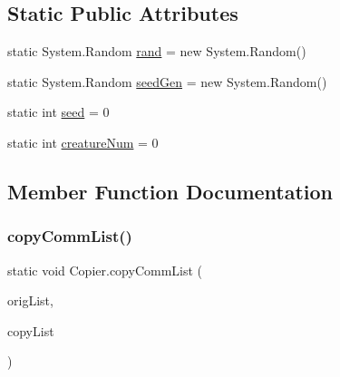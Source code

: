 \subsection*{Static Public Attributes}
\begin{DoxyCompactItemize}
\item 
static System.\+Random \mbox{\hyperlink{class_copier_ac2bbed854907158508f714b65783418e}{rand}} = new System.\+Random()
\item 
static System.\+Random \mbox{\hyperlink{class_copier_a74089df571f0e9ffadd5879bf0199dac}{seed\+Gen}} = new System.\+Random()
\item 
static int \mbox{\hyperlink{class_copier_a5f70131c00bf001cc92dd4cee4a80540}{seed}} = 0
\item 
static int \mbox{\hyperlink{class_copier_ab7101a9420cdd74139f3c83d9ec8ed25}{creature\+Num}} = 0
\end{DoxyCompactItemize}


\subsection{Member Function Documentation}
\mbox{\label{class_copier_a4013b1f8da509a6471f0feed3ec94ae3}} 
\subsubsection{\texorpdfstring{copy\+Comm\+List()}{copyCommList()}}
{\footnotesize\ttfamily static void Copier.\+copy\+Comm\+List (\begin{DoxyParamCaption}\item[{List$<$ \mbox{\hyperlink{class_comm_signal}{Comm\+Signal}} $>$}]{orig\+List,  }\item[{List$<$ \mbox{\hyperlink{class_comm_signal}{Comm\+Signal}} $>$}]{copy\+List }\end{DoxyParamCaption})\hspace{0.3cm}{\ttfamily [static]}}

\mbox{\label{class_copier_a4c529b374830077f75db4520bb55e225}} 
